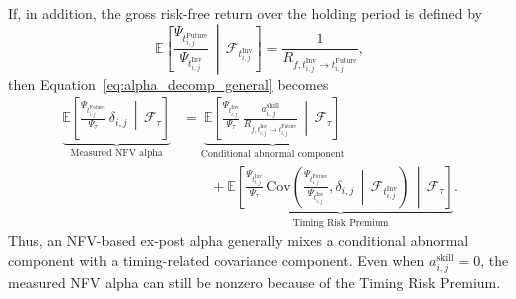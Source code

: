 \begin{remark}
	If, in addition, the gross risk-free return over the holding period is defined by
	\[
	\mathbb{E}\!\left[
	\frac{\Psi_{t_{i,j}^{\mathrm{Future}}}}{\Psi_{t_{i,j}^{\mathrm{Inv}}}}
	\,\middle|\,
	\mathcal{F}_{t_{i,j}^{\mathrm{Inv}}}
	\right]
	=
	\frac{1}{R_{f,t_{i,j}^{\mathrm{Inv}}\to t_{i,j}^{\mathrm{Future}}}},
	\]
	then Equation~\eqref{eq:alpha_decomp_general} becomes
	\begin{align}
		\label{eq:alpha_decomp}
		\underbrace{
			\mathbb{E}\!\left[
			\frac{\Psi_{t_{i,j}^{\mathrm{Future}}}}{\Psi_\tau}\,
			\delta_{i,j}
			\,\middle|\,
			\mathcal{F}_\tau
			\right]
		}_{\text{Measured NFV alpha}}
		&=
		\underbrace{
			\mathbb{E}\!\left[
			\frac{\Psi_{t_{i,j}^{\mathrm{Inv}}}}{\Psi_\tau}\,
			\frac{a_{i,j}^{\mathrm{skill}}}{R_{f,t_{i,j}^{\mathrm{Inv}}\to t_{i,j}^{\mathrm{Future}}}}
			\,\middle|\,
			\mathcal{F}_\tau
			\right]
		}_{\text{Conditional abnormal component}}
		\nonumber\\
		&\qquad
		+
		\underbrace{
			\mathbb{E}\!\left[
			\frac{\Psi_{t_{i,j}^{\mathrm{Inv}}}}{\Psi_\tau}\,
			\mathrm{Cov}\!\left(
			\frac{\Psi_{t_{i,j}^{\mathrm{Future}}}}{\Psi_{t_{i,j}^{\mathrm{Inv}}}},
			\delta_{i,j}
			\,\middle|\,
			\mathcal{F}_{t_{i,j}^{\mathrm{Inv}}}
			\right)
			\,\middle|\,
			\mathcal{F}_\tau
			\right]
		}_{\text{Timing Risk Premium}}.
	\end{align}
	Thus, an NFV-based ex-post alpha generally mixes a conditional abnormal component with a timing-related covariance component.
	Even when $a_{i,j}^{\mathrm{skill}}=0$, the measured NFV alpha can still be nonzero because of the Timing Risk Premium.
\end{remark}